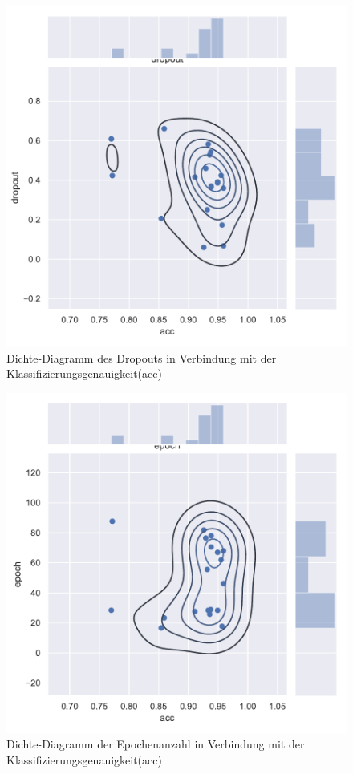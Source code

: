 \begin{figure}[H]
  \centering  
  \includegraphics[scale=0.5]{anhang/GA_50_mnist_digits_True_big_jointplot_dropout.pdf}
  \caption{Dichte-Diagramm des Dropouts in Verbindung mit der Klassifizierungsgenauigkeit(acc)}
  
\end{figure}

\begin{figure}[H]
  \centering  
  \includegraphics[scale=0.5]{anhang/GA_50_mnist_digits_True_big_jointplot_epoch.pdf}
  \caption{Dichte-Diagramm der Epochenanzahl in Verbindung mit der Klassifizierungsgenauigkeit(acc)}
\end{figure}

